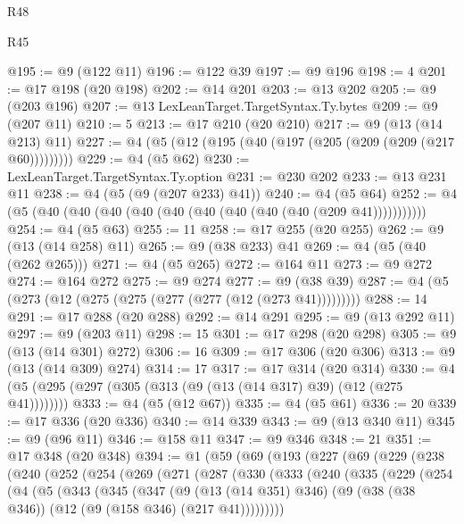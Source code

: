 \begin{lexlean}{R48}
\begin{lexlean}{R45}
\begin{coremodule}
{{{{{{{{{{{{{{{{{{{{{{{{{{{{{{{{{{{{{{{{{{{{{{{{{{{{{{{{{{{{{{{{{{{{{{{{{{{{{{{{{{{{{{{{{{{@195 := @9 (@122 @11)
@196 := @122 @39
@197 := @9 @196
@198 := 4
@201 := @17 @198 (@20 @198)
@202 := @14 @201
@203 := @13 @202
@205 := @9 (@203 @196)
@207 := @13 LexLeanTarget.TargetSyntax.Ty.bytes
@209 := @9 (@207 @11)
@210 := 5
@213 := @17 @210 (@20 @210)
@217 := @9 (@13 (@14 @213) @11)
@227 := @4 (@5 (@12 (@195 (@40 (@197 (@205 (@209 (@209 (@217 @60)))))))))
@229 := @4 (@5 @62)
@230 := LexLeanTarget.TargetSyntax.Ty.option
@231 := @230 @202
@233 := @13 @231 @11
@238 := @4 (@5 (@9 (@207 @233) @41))
@240 := @4 (@5 @64)
@252 := @4 (@5 (@40 (@40 (@40 (@40 (@40 (@40 (@40 (@40 (@40 (@209 @41)))))))))))
@254 := @4 (@5 @63)
@255 := 11
@258 := @17 @255 (@20 @255)
@262 := @9 (@13 (@14 @258) @11)
@265 := @9 (@38 @233) @41
@269 := @4 (@5 (@40 (@262 @265)))
@271 := @4 (@5 @265)
@272 := @164 @11
@273 := @9 @272
@274 := @164 @272
@275 := @9 @274
@277 := @9 (@38 @39)
@287 := @4 (@5 (@273 (@12 (@275 (@275 (@277 (@277 (@12 (@273 @41)))))))))
@288 := 14
@291 := @17 @288 (@20 @288)
@292 := @14 @291
@295 := @9 (@13 @292 @11)
@297 := @9 (@203 @11)
@298 := 15
@301 := @17 @298 (@20 @298)
@305 := @9 (@13 (@14 @301) @272)
@306 := 16
@309 := @17 @306 (@20 @306)
@313 := @9 (@13 (@14 @309) @274)
@314 := 17
@317 := @17 @314 (@20 @314)
@330 := @4 (@5 (@295 (@297 (@305 (@313 (@9 (@13 (@14 @317) @39) (@12 (@275 @41))))))))
@333 := @4 (@5 (@12 @67))
@335 := @4 (@5 @61)
@336 := 20
@339 := @17 @336 (@20 @336)
@340 := @14 @339
@343 := @9 (@13 @340 @11)
@345 := @9 (@96 @11)
@346 := @158 @11
@347 := @9 @346
@348 := 21
@351 := @17 @348 (@20 @348)
@394 := @1
    (@59
      (@69
        (@193
          (@227
            (@69
              (@229
                (@238
                  (@240
                    (@252
                      (@254
                        (@269
                          (@271
                            (@287
                              (@330
                                (@333
                                  (@240
                                    (@335
                                      (@229
                                        (@254
                                          (@4
                                            (@5
                                              (@343
                                                (@345
                                                  (@347
                                                    (@9
                                                      (@13 (@14 @351) @346)
                                                      (@9
                                                        (@38 (@38 @346))
                                                        (@12 (@9 (@158 @346) (@217 @41)))))))))
}}}}}}}}}}}}}}}}}}}}}}}}}}}}}}}}}}}}}}}}}}}}}}}}}}}}}}}}}}}}}}}}}}}}}}}}}}}}}}}}}}}}}}}}}}}
\end{coremodule}
\end{lexlean}
\end{lexlean}

